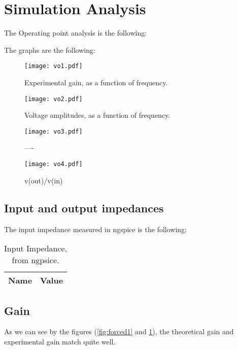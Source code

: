 \section{Simulation Analysis}
\label{sec:simulation}

The Operating point analysis is the following:


The graphs are the following:


\begin{figure}[H] \centering
\texttt{[image: vo1.pdf]}
\caption{Experimental gain, as a function of frequency.}
\label{fig:acm1}
\end{figure}


\begin{figure}[H] \centering
\texttt{[image: vo2.pdf]}
\caption{Voltage amplitudes, as a function of frequency.}
\label{fig:acm2}
\end{figure}


\begin{figure}[H] \centering
\texttt{[image: vo3.pdf]}
\caption{----}
\label{fig:acm}
\end{figure}

\begin{figure}[H] \centering
\texttt{[image: vo4.pdf]}
\caption{v(out)/v(in)}
\label{fig:acm}
\end{figure}

\subsection{Input and output impedances}
The input impedance measured in ngspice is the following:

\begin{table}[H]
  \centering
  \begin{tabular}{|l|r|}
    \hline    
    {\bf Name} & {\bf Value } \\ \hline
    
  \end{tabular}
  \caption{Input Impedance, from ngpsice.}
  \label{tab:op}
\end{table}

\subsection{Gain}
As we can see by the figures (\ref{fig:forced1} and \ref{fig:acm1}), the theoretical gain and experimental gain match quite well.

